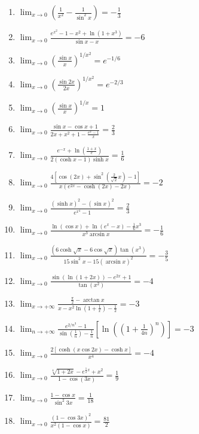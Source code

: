 \documentclass[11pt,a4paper]{article}
\begin{document}
\begin{enumerate}
\item $\displaystyle \lim_{x \to 0} \left(\frac{1}{x^{2}} - \frac{1}{\sin^{2} x}\right) = -\frac{1}{3}$
\item $\displaystyle \lim_{x \to 0} \frac{e^{x^{2}} - 1 - x^{2} + \ln(1 + x^{3})}{\sin x - x} = -6$
\item $\displaystyle \lim_{x \to 0} \left(\frac{\sin x}{x}\right)^{1/x^{2}} = e^{-1/6}$
\item $\displaystyle \lim_{x \to 0} \left(\frac{\sin 2x}{2x}\right)^{1/x^{2}} = e^{-2/3}$
\item $\displaystyle \lim_{x \to 0} \left(\frac{\sin x}{x}\right)^{1/x} = 1$
\item $\displaystyle \lim_{x \to 0} \frac{\sin x - \cos x + 1}{2x + x^{2} + 1 - \frac{e^{x} - 1}{x}} = \frac{2}{3}$
\item $\displaystyle \lim_{x \to 0} \frac{e^{-x} + \ln\left(\frac{1 + x}{e}\right)}{2(\cosh x - 1)\sinh x} = \frac{1}{6}$
\item $\displaystyle \lim_{x \to 0} \frac{4\left[\cos(2x) + \sin^{2}\left(\frac{2}{\sqrt{2}}x\right) - 1\right]}{x\left(e^{2x} - \cosh(2x) - 2x\right)} = -2$
\item $\displaystyle \lim_{x \to 0} \frac{(\sinh x)^{2} - (\sin x)^{2}}{e^{x^{4}} - 1} = \frac{2}{3}$
\item $\displaystyle \lim_{x \to 0} \frac{\ln(\cos x) + \ln(e^{x} - x) - \frac{1}{6}x^{3}}{x^{3}\arcsin x} = -\frac{1}{6}$
\item $\displaystyle \lim_{x \to 0} \frac{(6\cosh\sqrt{x} - 6\cos\sqrt{x})\tan(x^{3})}{15\sin^{2} x - 15(\arcsin x)^{2}} = -\frac{3}{5}$
\item $\displaystyle \lim_{x \to 0} \frac{\sin(\ln(1 + 2x)) - e^{2x} + 1}{\tan(x^{2})} = -4$
\item $\displaystyle \lim_{x \to +\infty} \frac{\frac{\pi}{2} - \arctan x}{x - x^{2}\ln\left(1 + \frac{1}{x}\right) - \frac{1}{2}} = -3$
\item $\displaystyle \lim_{n \to +\infty} \frac{e^{2/n^{3}} - 1}{\sin\left(\frac{1}{n}\right) - \frac{1}{n}}\left[\ln\left(\left(1 + \frac{1}{4n}\right)^{n}\right)\right] = -3$
\item $\displaystyle \lim_{x \to 0} \frac{2\left[\cosh(x\cos 2x) - \cosh x\right]}{x^{4}} = -4$
\item $\displaystyle \lim_{x \to 0} \frac{\sqrt[4]{1 + 2x} - e^{\frac{1}{2}x} + x^{2}}{1 - \cos(3x)} = \frac{1}{9}$
\item $\displaystyle \lim_{x \to 0} \frac{1 - \cos x}{\sin^{2} 3x} = \frac{1}{18}$
\item $\displaystyle \lim_{x \to 0} \frac{(1 - \cos 3x)^{2}}{x^{2}(1 - \cos x)} = \frac{81}{2}$

\end{enumerate}
\end{document}
